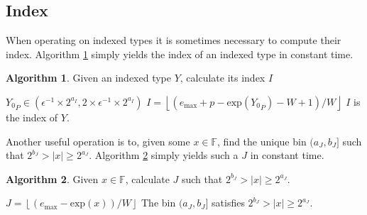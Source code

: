 \documentclass[12pt]{article}
\providecommand{\floor}[1]{\left \lfloor #1 \right \rfloor }
\providecommand{\F}{\ensuremath{\mathbb{F}}}
\providecommand{\exp}{\ensuremath{\text{exp}}}
\providecommand{\max}{\ensuremath{\text{max}}}
\theoremstyle{definition}
\newtheorem{alg}{Algorithm}[section]
\numberwithin{equation}{section}
\begin{document}
  \subsection{Index}
    \label{sec:basicops_index}
    When operating on indexed types it is sometimes necessary to compute their index. Algorithm \ref{alg:iindex} simply yields the index of an indexed type in constant time.
    \begin{alg}
      Given an indexed type $Y$, calculate its index $I$
      \begin{algorithmic}[1]
        \Require
          \Statex ${Y_0}_P \in (\epsilon^{-1} \times 2^{a_{I}}, 2 \times \epsilon^{-1} \times 2^{a_I})$
          \State $I = \floor{(e_{\max} + p - \exp({Y_0}_P) - W + 1)/W}$
        \EndFunction
        \Ensure
          \Statex $I$ is the index of $Y$.
      \end{algorithmic}
      \label{alg:iindex}
    \end{alg}

    Another useful operation is to, given some $x \in \F$, find the unique bin $(a_J, b_J]$ such that $2^{b_J} > |x| \geq 2^{a_J}$. Algorithm \ref{alg:index} simply yields such a $J$ in constant time.
    \begin{alg}
      Given $x \in \F$, calculate $J$ such that $2^{b_J} > |x| \geq 2^{a_J}$.
      \begin{algorithmic}[1]
          \State $J = \floor{(e_{\max} - \exp(x))/W}$
        \EndFunction
        \Ensure
          \Statex The bin $(a_{J}, b_{J}]$ satisfies $2^{b_{J}} > |x| \geq 2^{a_{J}}$.
      \end{algorithmic}
      \label{alg:index}
    \end{alg}
\end{document}
